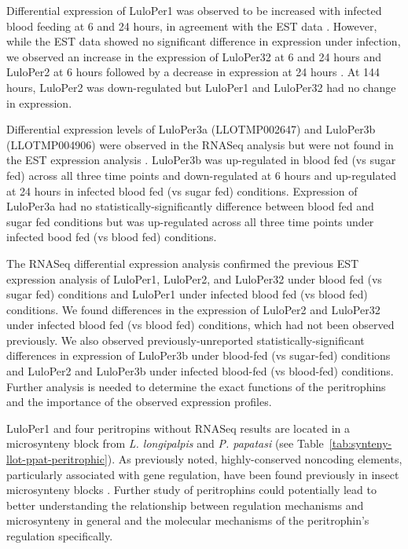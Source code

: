 Differential expression of LuloPer1 was observed to be increased with infected blood feeding at 6 and 24 hours, in agreement with the EST data \cite{Jochim2008,Dostalova2012}.  However, while the EST data showed no significant difference in expression under infection, we observed an increase in the expression of LuloPer32 at 6 and 24 hours and LuloPer2 at 6 hours followed by a decrease in expression at 24 hours \cite{Jochim2008}.  At 144 hours, LuloPer2 was down-regulated but LuloPer1 and LuloPer32 had no change in expression.

Differential expression levels of LuloPer3a (LLOTMP002647) and LuloPer3b (LLOTMP004906) were observed in the RNASeq analysis but were not found in the EST expression analysis \cite{Jochim2008}. LuloPer3b was up-regulated in blood fed (vs sugar fed) across all three time points and down-regulated at 6 hours and up-regulated at 24 hours in infected blood fed (vs sugar fed) conditions.  Expression of LuloPer3a had no statistically-significantly difference between blood fed and sugar fed conditions but was up-regulated across all three time points under infected bood fed (vs blood fed) conditions.

The RNASeq differential expression analysis confirmed the previous EST expression analysis of LuloPer1, LuloPer2, and LuloPer32 under blood fed (vs sugar fed) conditions and LuloPer1 under infected blood fed (vs blood fed) conditions.  We found differences in the expression of LuloPer2 and LuloPer32 under infected blood fed (vs blood fed) conditions, which had not been observed previously.  We also observed previously-unreported statistically-significant differences in expression of LuloPer3b under blood-fed (vs sugar-fed) conditions and LuloPer2 and LuloPer3b under infected blood-fed (vs blood-fed) conditions. Further analysis is needed to determine the exact functions of the peritrophins and the importance of the observed expression profiles.

LuloPer1 and four peritropins without RNASeq results are located in a microsynteny block from \emph{L. longipalpis} and \emph{P. papatasi} (see Table~\ref{tab:synteny-llot-ppat-peritrophic}). As previously noted, highly-conserved noncoding elements, particularly associated with gene regulation, have been found previously in insect microsynteny blocks \cite{Engstrom2007}.  Further study of peritrophins could potentially lead to  better understanding the relationship between regulation mechanisms and microsynteny in general and the molecular mechanisms of the peritrophin's regulation specifically.




